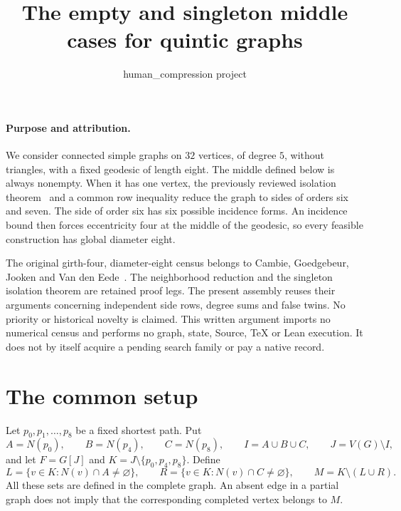 \documentclass[11pt]{article}
\title{The empty and singleton middle cases for quintic graphs}
\author{human\_compression project}
\date{}
\begin{document}
\maketitle

\paragraph{Purpose and attribution.}
We consider connected simple graphs on $32$ vertices, of degree $5$,
without triangles, with a fixed geodesic of length eight. The middle
defined below is always nonempty. When it has one vertex, the previously
reviewed isolation theorem~\cite{singleton} and a common row inequality
reduce the graph to sides of orders six and seven. The side of order six
has six possible incidence forms. An incidence bound then forces
eccentricity four at the middle of the geodesic, so every feasible
construction has global diameter eight.

The original girth-four, diameter-eight census belongs to Cambie,
Goedgebeur, Jooken and Van den Eede~\cite{cages}. The neighborhood
reduction and the singleton isolation theorem are retained proof legs.
The present assembly reuses their arguments concerning independent side
rows, degree sums and false twins. No priority or historical novelty is
claimed. This written argument imports no numerical census and performs
no graph, state, Source, TeX or Lean execution. It does not by itself
acquire a pending search family or pay a native record.

\section*{The common setup}

Let $p_0,p_1,\ldots,p_8$ be a fixed shortest path. Put
\[
 A=N(p_0),\qquad B=N(p_4),\qquad C=N(p_8),\qquad
 I=A\cup B\cup C,\qquad J=V(G)\setminus I,
\]
and let $F=G[J]$ and $K=J\setminus\{p_0,p_4,p_8\}$. Define
\[
 L=\{v\in K:N(v)\cap A\ne\varnothing\},\qquad
 R=\{v\in K:N(v)\cap C\ne\varnothing\},\qquad
 M=K\setminus(L\cup R).
\]
All these sets are defined in the complete graph. An absent edge in a
partial graph does not imply that the corresponding completed vertex
belongs to $M$.
\end{document}
